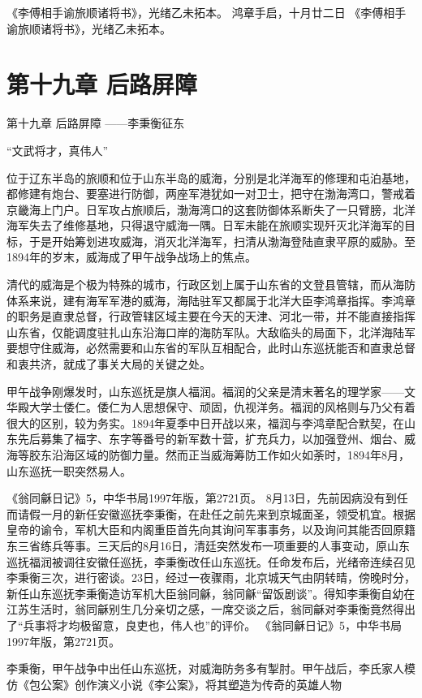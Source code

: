 \documentclass[12pt,UTF8]{ctexbook}
\begin{document}
《李傅相手谕旅顺诸将书》，光绪乙未拓本。
鸿章手启，十月廿二日 《李傅相手谕旅顺诸将书》，光绪乙未拓本。

\chapter{第十九章 后路屏障}

第十九章
后路屏障
——李秉衡征东

“文武将才，真伟人”

位于辽东半岛的旅顺和位于山东半岛的威海，分别是北洋海军的修理和屯泊基地，都修建有炮台、要塞进行防御，两座军港犹如一对卫士，把守在渤海湾口，警戒着京畿海上门户。日军攻占旅顺后，渤海湾口的这套防御体系断失了一只臂膀，北洋海军失去了维修基地，只得退守威海一隅。日军未能在旅顺实现歼灭北洋海军的目标，于是开始筹划进攻威海，消灭北洋海军，扫清从渤海登陆直隶平原的威胁。至1894年的岁末，威海成了甲午战争战场上的焦点。

清代的威海是个极为特殊的城市，行政区划上属于山东省的文登县管辖，而从海防体系来说，建有海军军港的威海，海陆驻军又都属于北洋大臣李鸿章指挥。李鸿章的职务是直隶总督，行政管辖区域主要在今天的天津、河北一带，并不能直接指挥山东省，仅能调度驻扎山东沿海口岸的海防军队。大敌临头的局面下，北洋海陆军要想守住威海，必然需要和山东省的军队互相配合，此时山东巡抚能否和直隶总督和衷共济，就成了事关大局的关键之处。

甲午战争刚爆发时，山东巡抚是旗人福润。福润的父亲是清末著名的理学家——文华殿大学士倭仁。倭仁为人思想保守、顽固，仇视洋务。福润的风格则与乃父有着很大的区别，较为务实。1894年夏季中日开战以来，福润与李鸿章配合默契，在山东先后募集了福字、东字等番号的新军数十营，扩充兵力，以加强登州、烟台、威海等胶东沿海区域的防御力量。然而正当威海筹防工作如火如荼时，1894年8月，山东巡抚一职突然易人。

《翁同龢日记》5，中华书局1997年版，第2721页。
8月13日，先前因病没有到任而请假一月的新任安徽巡抚李秉衡，在赴任之前先来到京城面圣，领受机宜。根据皇帝的谕令，军机大臣和内阁重臣首先向其询问军事事务，以及询问其能否回原籍东三省练兵等事。三天后的8月16日，清廷突然发布一项重要的人事变动，原山东巡抚福润被调往安徽任巡抚，李秉衡改任山东巡抚。任命发布后，光绪帝连续召见李秉衡三次，进行密谈。23日，经过一夜骤雨，北京城天气由阴转晴，傍晚时分，新任山东巡抚李秉衡造访军机大臣翁同龢，翁同龢“留饭剧谈”。得知李秉衡自幼在江苏生活时，翁同龢别生几分亲切之感，一席交谈之后，翁同龢对李秉衡竟然得出了“兵事将才均极留意，良吏也，伟人也”的评价。 《翁同龢日记》5，中华书局1997年版，第2721页。


李秉衡，甲午战争中出任山东巡抚，对威海防务多有掣肘。甲午战后，李氏家人模仿《包公案》创作演义小说《李公案》，将其塑造为传奇的英雄人物
\end{document}
